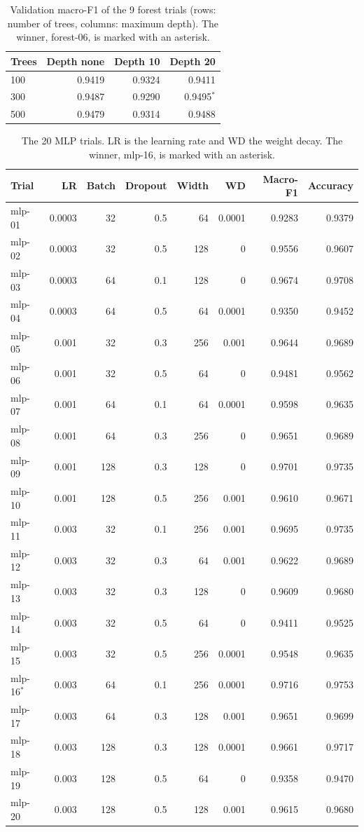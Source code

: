 \begin{table}[htbp]
\centering
\caption{Validation macro-F1 of the 9 forest trials (rows: number of trees, columns: maximum depth). The winner, forest-06, is marked with an asterisk.}
\label{tab:landmark-forest-trials}
\begin{tabular}{lrrr}
\toprule
Trees & Depth none & Depth 10 & Depth 20 \\
\midrule
100 & 0.9419 & 0.9324 & 0.9411 \\
300 & 0.9487 & 0.9290 & 0.9495$^{*}$ \\
500 & 0.9479 & 0.9314 & 0.9488 \\
\bottomrule
\end{tabular}
\end{table}

\begin{table}[htbp]
\centering
\small
\caption{The 20 MLP trials. LR is the learning rate and WD the weight decay. The winner, mlp-16, is marked with an asterisk.}
\label{tab:landmark-mlp-trials}
\begin{tabular}{lrrrrrrr}
\toprule
Trial & LR & Batch & Dropout & Width & WD & Macro-F1 & Accuracy \\
\midrule
mlp-01 & 0.0003 & 32 & 0.5 & 64 & 0.0001 & 0.9283 & 0.9379 \\
mlp-02 & 0.0003 & 32 & 0.5 & 128 & 0 & 0.9556 & 0.9607 \\
mlp-03 & 0.0003 & 64 & 0.1 & 128 & 0 & 0.9674 & 0.9708 \\
mlp-04 & 0.0003 & 64 & 0.5 & 64 & 0.0001 & 0.9350 & 0.9452 \\
mlp-05 & 0.001 & 32 & 0.3 & 256 & 0.001 & 0.9644 & 0.9689 \\
mlp-06 & 0.001 & 32 & 0.5 & 64 & 0 & 0.9481 & 0.9562 \\
mlp-07 & 0.001 & 64 & 0.1 & 64 & 0.0001 & 0.9598 & 0.9635 \\
mlp-08 & 0.001 & 64 & 0.3 & 256 & 0 & 0.9651 & 0.9689 \\
mlp-09 & 0.001 & 128 & 0.3 & 128 & 0 & 0.9701 & 0.9735 \\
mlp-10 & 0.001 & 128 & 0.5 & 256 & 0.001 & 0.9610 & 0.9671 \\
mlp-11 & 0.003 & 32 & 0.1 & 256 & 0.001 & 0.9695 & 0.9735 \\
mlp-12 & 0.003 & 32 & 0.3 & 64 & 0.001 & 0.9622 & 0.9689 \\
mlp-13 & 0.003 & 32 & 0.3 & 128 & 0 & 0.9609 & 0.9680 \\
mlp-14 & 0.003 & 32 & 0.5 & 64 & 0 & 0.9411 & 0.9525 \\
mlp-15 & 0.003 & 32 & 0.5 & 256 & 0.0001 & 0.9548 & 0.9635 \\
mlp-16$^{*}$ & 0.003 & 64 & 0.1 & 256 & 0.0001 & 0.9716 & 0.9753 \\
mlp-17 & 0.003 & 64 & 0.3 & 128 & 0.001 & 0.9651 & 0.9699 \\
mlp-18 & 0.003 & 128 & 0.3 & 128 & 0.0001 & 0.9661 & 0.9717 \\
mlp-19 & 0.003 & 128 & 0.5 & 64 & 0 & 0.9358 & 0.9470 \\
mlp-20 & 0.003 & 128 & 0.5 & 128 & 0.001 & 0.9615 & 0.9680 \\
\bottomrule
\end{tabular}
\end{table}

